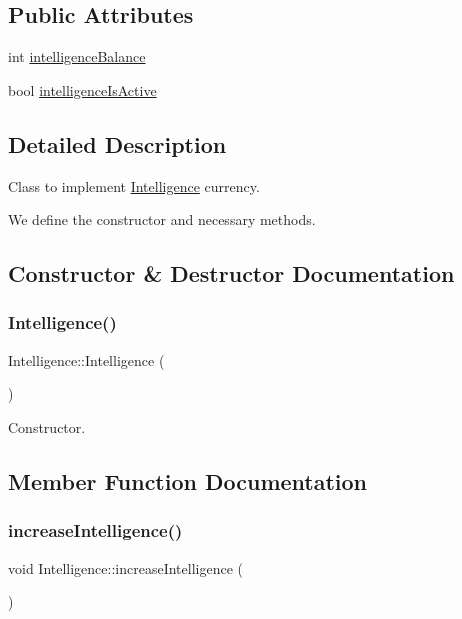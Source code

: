 \subsection*{Public Attributes}
\begin{DoxyCompactItemize}
\item 
int \hyperlink{classIntelligence_a20fc418262dd34db0d9e99d81d6a7544}{intelligence\+Balance}
\item 
bool \hyperlink{classIntelligence_ad8d4fda31beb86dc434f71fe6c683ae9}{intelligence\+Is\+Active}
\end{DoxyCompactItemize}


\subsection{Detailed Description}
Class to implement \hyperlink{classIntelligence}{Intelligence} currency. 

We define the constructor and necessary methods. 

\subsection{Constructor \& Destructor Documentation}
\mbox{\label{classIntelligence_a146fc36901bb5993c71b0d9426439fea}} 
\subsubsection{\texorpdfstring{Intelligence()}{Intelligence()}}
{\footnotesize\ttfamily Intelligence\+::\+Intelligence (\begin{DoxyParamCaption}{ }\end{DoxyParamCaption})}

Constructor. 

\subsection{Member Function Documentation}
\mbox{\label{classIntelligence_ad822db7ef4eef6c1f797f65c73fec3f0}} 
\subsubsection{\texorpdfstring{increase\+Intelligence()}{increaseIntelligence()}}
{\footnotesize\ttfamily void Intelligence\+::increase\+Intelligence (\begin{DoxyParamCaption}{ }\end{DoxyParamCaption})}


